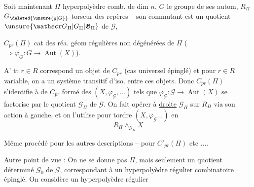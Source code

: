 Soit maintenant $\Pi$ hyperpolyèdre comb. de dim $n$, $G$ le groupe de ses autom, $R_\Pi$ $G_{\deleted{\unsure{g|G}}}$-torseur des repères -- son commutant est un quotient $\unsure{\mathscr G_\Pi|G_\Pi|\mathfrak G_\Pi}$ de $\mathscr G$,

$C_{pr}(\Pi)$ cat des réa. géom régulières  non dégénérées de $\Pi$ ($\Rightarrow\varphi_G:G\longrightarrow\operatorname{Aut}(X)$).

A' tt $r\in R$ correspond un objet de $C_{pr}$ (cas universel épinglé) et pour $r\in R$ variable, on a un système transitif d'iso. entre ces objets. Donc $C_{pr}(\Pi)$ s'identifie  à    de $C_{pr}$ formé des $(X,\varphi_{\mathscr G},\ldots)$ tels que $\varphi_{\mathscr G}:\mathscr G\longrightarrow\operatorname{Aut}(X)$ se factorise par le quotient $\mathscr G_\Pi$ de $\mathscr G$. On fait opérer à \uline{droite} $\mathscr G_\Pi$ sur $R_\Pi$ via son action à gauche, et on l'utilise pour tordre $(X,\varphi_{\mathscr G}\ldots)$ en
\[
R_\Pi\mathbin{\wedge_{\mathscr G_\Pi}} X
\]

Même procédé pour les autres descriptions -- pour $C'_{pr}(\Pi)$ etc ....

Autre point de vue : On ne se donne pas $\Pi$, mais seulement un  quotient déterminé $\mathscr G_0$ de $\mathscr G$,  correspondant à un hyperpolyèdre régulier combinatoire épinglé. On considère un hyperpolyèdre régulier


